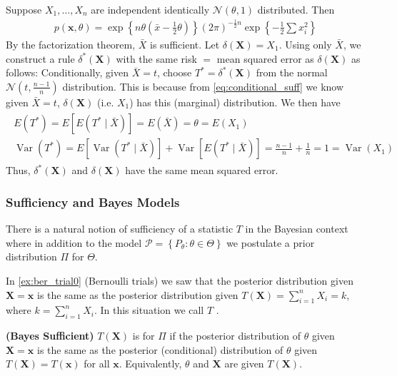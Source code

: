 \documentclass{article}
\newcommand{\bfs}[1]{\textbf{({#1}) }}
\begin{document}
\begin{exma}
  Suppose $X_{1}, \ldots, X_{n}$ are independent identically $\mathcal{N}(\theta, 1)$ distributed. Then
\begin{align*}
p(\mathbf{x}, \theta)=\exp \left\{n \theta\left(\bar{x}-\frac{1}{2} \theta\right)\right\}(2 \pi)^{-\frac{1}{2} n} \exp \left\{-\frac{1}{2} \sum x_{i}^{2}\right\}
\end{align*}
By the factorization theorem, $\bar{X}$ is sufficient. Let $\delta(\mathbf{X})=X_{1}$. Using only $\bar{X}$, we construct a rule $\delta^{*}(\mathbf{X})$ with the same risk $=$ mean squared error as $\delta(\mathbf{X})$ as follows: Conditionally, given $\bar{X}=t$, choose $T^{*}=\delta^{*}(\mathbf{X})$ from the normal $\mathcal{N}\left(t, \frac{n-1}{n}\right)$ distribution. 
This is because from \cref{eq:conditional_suff} we know given $\bar{X}=t$, $\delta(\mathbf{X})$ (i.e. $X_1$) has this (marginal) distribution. 
We then have
\begin{align*}
\begin{gathered}
E\left(T^{*}\right)=E\left[E\left(T^{*} \mid \bar{X}\right)\right]=E(\bar{X})=\theta=E\left(X_{1}\right) \\
\operatorname{Var}\left(T^{*}\right)=E\left[\operatorname{Var}\left(T^{*} \mid \bar{X}\right)\right]+\operatorname{Var}\left[E\left(T^{*} \mid \bar{X}\right)\right]=\frac{n-1}{n}+\frac{1}{n}=1=\operatorname{Var}\left(X_{1}\right)
\end{gathered}
\end{align*}
Thus, $\delta^{*}(\mathbf{X})$ and $\delta(\mathbf{X})$ have the same mean squared error.
\end{exma}

\subsubsection{Sufficiency and Bayes Models}\label{sec:Bayes_suff}
There is a natural notion of sufficiency of a statistic $T$ in the Bayesian context where in addition to the model $\mathcal{P}=\left\{P_{\theta}: \theta \in \Theta\right\}$ we postulate a prior distribution $\Pi$ for $\Theta$.

In \cref{ex:ber_trial0} (Bernoulli trials) we saw that the posterior distribution given $\mathbf{X}=\mathbf{x}$ is the same as the posterior distribution given $T(\mathbf{X})=\sum_{i=1}^{n} X_{i}=k$, where $k=\sum_{i=1}^{n} X_{i}$. In this situation we call $T$ .


\begin{defa}\bfs{Bayes Sufficient}
 $T(\mathbf{X})$ is  for $\Pi$ if the posterior distribution of $\theta$ given $\mathbf{X}=\mathbf{x}$ is the same as the posterior (conditional) distribution of $\theta$ given $T(\mathbf{X})=T(\mathbf{x})$ for all $\mathbf{x}$. Equivalently, $\theta$ and $\mathbf{X}$ are  given $T(\mathbf{X})$.
\end{defa}
\end{document}
